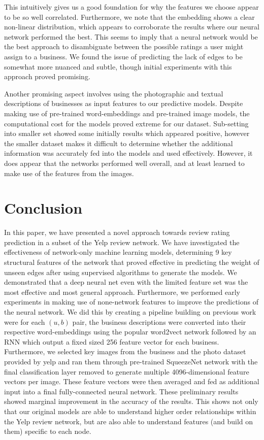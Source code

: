 \documentclass[letterpaper, 10 pt, conference]{ieeeconf}  %
\begin{document}
This intuitively gives us a good foundation for why the features we choose appear to be so well correlated. Furthermore, we note that the embedding shows a clear non-linear distribution, which appears to corroborate the results where our neural network performed the best. This seems to imply that a neural network would be the best approach to disambiguate between the possible ratings a user might assign to a business. We found the issue of predicting the lack of edges to be somewhat more nuanced and subtle, though initial experiments with this approach proved promising.

Another promising aspect involves using the photographic and textual descriptions of businesses as input features to our predictive models. Despite making use of pre-trained word-embeddings and pre-trained image models, the computational cost for the models proved extreme for our dataset. Sub-setting into smaller set showed some initially results which appeared positive, however the smaller dataset makes it difficult to determine whether the additional information was accurately fed into the models and used effectively. However, it does appear that the networks performed well overall, and at least learned to make use of the features from the images.

\section{Conclusion}
In this paper, we have presented a novel approach towards review rating prediction in a subset of the Yelp review network. We have investigated the effectiveness of network-only machine learning models, determining 9 key structural features of the network that proved effective in predicting the weight of unseen edges after using supervised algorithms to generate the models. We demonstrated that a deep neural net even with the limited feature set was the most effective and most general approach. Furthermore, we performed early experiments in making use of none-network features to improve the predictions of the neural network. We did this by creating a pipeline building on previous work were for each $(u,b)$ pair, the business descriptions were converted into their respective word-embeddings using the popular word2vect network followed by an RNN which output a fixed sized 256 feature vector for each business. Furthermore, we selected key images from the business and the photo dataset provided by yelp and ran them through pre-trained SqueezeNet network with the final classification layer removed to generate multiple 4096-dimensional feature vectors per image. These feature vectors were then averaged and fed as additional input into a final fully-connected neural network. These preliminary results showed marginal improvement in the accuracy of the results. This shows not only that our original models are able to understand higher order relationships within the Yelp review network, but are also able to understand features (and build on them) specific to each node.
\end{document}
